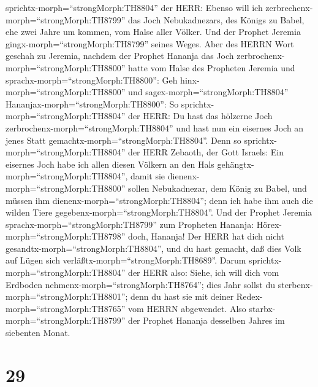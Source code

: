 sprichtx-morph=``strongMorph:TH8804'' der HERR: Ebenso will ich
zerbrechenx-morph=``strongMorph:TH8799'' das Joch Nebukadnezars, des
Königs zu Babel, ehe zwei Jahre um kommen, vom Halse aller Völker. Und
der Prophet Jeremia gingx-morph=``strongMorph:TH8799'' seines Weges.
 Aber des HERRN Wort geschah zu Jeremia, nachdem der
Prophet Hananja das Joch zerbrochenx-morph=``strongMorph:TH8800'' hatte
vom Halse des Propheten Jeremia und
sprachx-morph=``strongMorph:TH8800'':  Geh
hinx-morph=``strongMorph:TH8800'' und sagex-morph=``strongMorph:TH8804''
Hananjax-morph=``strongMorph:TH8800'': So
sprichtx-morph=``strongMorph:TH8804'' der HERR: Du hast das hölzerne
Joch zerbrochenx-morph=``strongMorph:TH8804'' und hast nun ein eisernes
Joch an jenes Statt gemachtx-morph=``strongMorph:TH8804''. 
Denn so sprichtx-morph=``strongMorph:TH8804'' der HERR Zebaoth, der Gott
Israels: Ein eisernes Joch habe ich allen diesen Völkern an den Hals
gehängtx-morph=``strongMorph:TH8804'', damit sie
dienenx-morph=``strongMorph:TH8800'' sollen Nebukadnezar, dem König zu
Babel, und müssen ihm dienenx-morph=``strongMorph:TH8804''; denn ich
habe ihm auch die wilden Tiere gegebenx-morph=``strongMorph:TH8804''.
 Und der Prophet Jeremia
sprachx-morph=``strongMorph:TH8799'' zum Propheten Hananja:
Hörex-morph=``strongMorph:TH8798'' doch, Hananja! Der HERR hat dich
nicht gesandtx-morph=``strongMorph:TH8804'', und du hast gemacht, daß
dies Volk auf Lügen sich verläßtx-morph=``strongMorph:TH8689''.
 Darum sprichtx-morph=``strongMorph:TH8804'' der HERR also:
Siehe, ich will dich vom Erdboden nehmenx-morph=``strongMorph:TH8764'';
dies Jahr sollst du sterbenx-morph=``strongMorph:TH8801''; denn du hast
sie mit deiner Redex-morph=``strongMorph:TH8765'' vom HERRN abgewendet.
 Also starbx-morph=``strongMorph:TH8799'' der Prophet
Hananja desselben Jahres im siebenten Monat.

\hypertarget{section-28}{%
\section{29}\label{section-28}}

